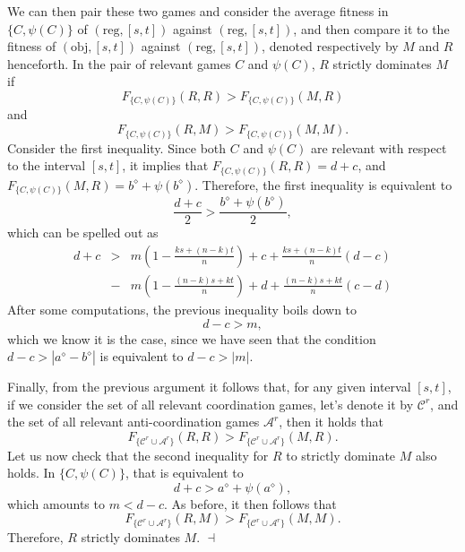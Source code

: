 \documentclass[fleqn,reqno,12pt]{article}
\theoremstyle{Satz}
\theoremstyle{Bsp}
\begin{document}
We can then pair these two games and consider the average fitness
in $\{C,\psi(C)\}$ of $(\text{reg},[s,t])$ against $(\text{reg},[s,t])$, and then compare it to the
fitness of $(\text{obj},[s,t])$ against $(\text{reg},[s,t])$, denoted respectively by $M$ and $R$ henceforth. In the pair of relevant games $C$ and
$\psi(C)$, $R$ strictly dominates $M$ if 
\[
F_{\{C,\psi(C)\}}(R,R)>F_{\{C,\psi(C)\}}(M,R)
\]
and
\[
F_{\{C,\psi(C)\}}(R,M)>F_{\{C,\psi(C)\}}(M,M).
\]
Consider the first inequality. Since both $C$ and $\psi(C)$ are
relevant with respect to the interval $[s,t]$, it implies that $F_{\{C,\psi(C)\}}(R,R)=d+c$,
and $F_{\{C,\psi(C)\}}(M,R)=b^{\diamond}+\psi(b^{\diamond})$. Therefore,
the first inequality is equivalent to 
\[
\frac{d+c}{2}>\frac{b^{\diamond}+\psi(b^{\diamond})}{2},
\]
which can be spelled out as
\[
\begin{array}{ccc}
d+c & > & m\left(1-\frac{ks+(n-k)t}{n}\right)+c+\frac{ks+(n-k)t}{n}(d-c)\\
 & - & m\left(1-\frac{(n-k)s+kt}{n}\right)+d+\frac{(n-k)s+kt}{n}(c-d)
\end{array}
\]
After some computations, the previous inequality boils down to
\[
d-c>m,
\]
which we know it is the case, since we have seen that the condition
$d-c>|a^{\diamond}-b^{\diamond}|$ is equivalent to $d-c>|m|$. 

Finally, from the previous argument it follows that, for any given
interval $[s,t]$, if we consider the set of all relevant coordination
games, let's denote it by $\mathcal{C}^{r}$, and the set of all relevant
anti-coordination games $\mathcal{A}^{r}$, then it holds that
\[
F_{\{\mathcal{C}^{r}\cup\mathcal{A}^{r}\}}(R,R)>F_{\{\mathcal{C}^{r}\cup\mathcal{A}^{r}\}}(M,R).
\]
Let us now check that the second inequality for $R$ to strictly dominate
$M$ also holds. In $\{C,\psi(C)\}$, that is equivalent to 
\[
d+c>a^{\diamond}+\psi(a^{\diamond}),
\]
which amounts to $m<d-c$. As before, it then follows that 
\[
F_{\{\mathcal{C}^{r}\cup\mathcal{A}^{r}\}}(R,M)>F_{\{\mathcal{C}^{r}\cup\mathcal{A}^{r}\}}(M,M).
\]
Therefore, $R$ strictly dominates $M$. \hfill $\dashv$



\newpage

\printbibliography[heading=bibintoc]
\end{document}
